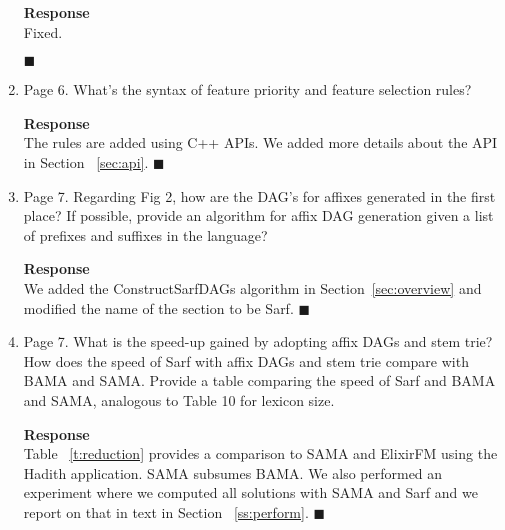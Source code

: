 \begin{enumerate}[leftmargin=0mm,label=\bfseries CommentR1.\arabic*]
\textbf{Response}\\
Fixed.

$\blacksquare$

\item\label{Review.1.3}
Page 6. What's the syntax of feature priority and feature selection rules?

\textbf{Response}\\
The rules are added using C++ APIs. We added more details about the API in Section ~\ref{sec:api}.
$\blacksquare$

\item\label{Review.1.4}
Page 7. Regarding Fig 2, how are the DAG's for affixes generated in the first place? If possible, provide an algorithm for affix DAG generation given a list of prefixes and suffixes in the language?

\textbf{Response}\\
We added the ConstructSarfDAGs algorithm in Section~\ref{sec:overview} 
and modified the name of the section to 
be Sarf. 
$\blacksquare$

\item\label{Review.1.5}
Page 7. What is the speed-up gained by adopting affix DAGs and stem trie? How does the speed of Sarf with affix DAGs and stem trie compare with  BAMA and SAMA. Provide a table comparing the speed of Sarf and BAMA and SAMA, analogous to Table 10 for lexicon size.

\textbf{Response}\\
Table ~\ref{t:reduction} provides a comparison to SAMA and ElixirFM using the Hadith application. SAMA subsumes BAMA.
We also performed an experiment where we computed all solutions with SAMA and Sarf and we report on that in text in 
Section ~\ref{ss:perform}.
$\blacksquare$


\end{enumerate}
